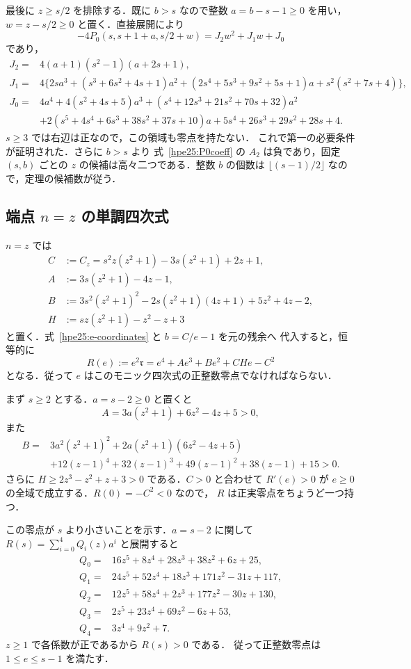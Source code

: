 最後に $z\ge s/2$ を排除する．既に $b>s$ なので整数
$a=b-s-1\ge0$ を用い，$w=z-s/2\ge0$ と置く．直接展開により
\begin{equation}\label{hpe25:wide-z}
 -4P_0(s,s+1+a,s/2+w)=J_2w^2+J_1w+J_0
\end{equation}
であり，
\begin{align*}
 J_2={}&4(a+1)(s^2-1)(a+2s+1),\\
 J_1={}&4\{2sa^3+(s^3+6s^2+4s+1)a^2
 +(2s^4+5s^3+9s^2+5s+1)a+s^2(s^2+7s+4)\},\\
 J_0={}&4a^4+4(s^2+4s+5)a^3
 +(s^4+12s^3+21s^2+70s+32)a^2\\
 &+2(s^5+4s^4+6s^3+38s^2+37s+10)a
 +5s^4+26s^3+29s^2+28s+4.
\end{align*}
$s\ge3$ では右辺は正なので，この領域も零点を持たない．
これで第一の必要条件が証明された．さらに $b>s$ より
式~\eqref{hpe25:P0coeff} の $A_2$ は負であり，固定 $(s,b)$ ごとの
$z$ の候補は高々二つである．整数 $b$ の個数は
$\lfloor(s-1)/2\rfloor$ なので，定理の候補数が従う．

\subsection{端点 \texorpdfstring{$n=z$}{n=z} の単調四次式}

$n=z$ では
\begin{align*}
 C&:=C_z=s^2z(z^2+1)-3s(z^2+1)+2z+1,\\
 A&:=3s(z^2+1)-4z-1,\\
 B&:=3s^2(z^2+1)^2-2s(z^2+1)(4z+1)+5z^2+4z-2,\\
 H&:=sz(z^2+1)-z^2-z+3
\end{align*}
と置く．式~\eqref{hpe25:e-coordinates} と $b=C/e-1$ を元の残余へ
代入すると，恒等的に
\begin{equation}\label{hpe25:R}
 R(e):=e^2\mathfrak r=e^4+Ae^3+Be^2+CHe-C^2
\end{equation}
となる．従って $e$ はこのモニック四次式の正整数零点でなければならない．

まず $s\ge2$ とする．$a=s-2\ge0$ と置くと
\[
 A=3a(z^2+1)+6z^2-4z+5>0,
\]
また
\begin{align*}
 B={}&3a^2(z^2+1)^2+2a(z^2+1)(6z^2-4z+5)\\
 &+12(z-1)^4+32(z-1)^3+49(z-1)^2+38(z-1)+15>0.
\end{align*}
さらに $H\ge2z^3-z^2+z+3>0$ である．$C>0$ と合わせて
$R'(e)>0$ が $e\ge0$ の全域で成立する．$R(0)=-C^2<0$ なので，
$R$ は正実零点をちょうど一つ持つ．

この零点が $s$ より小さいことを示す．$a=s-2$ に関して
$R(s)=\sum_{i=0}^4 Q_i(z)a^i$ と展開すると
\begin{align*}
Q_0={}&16z^5+8z^4+28z^3+38z^2+6z+25,\\
Q_1={}&24z^5+52z^4+18z^3+171z^2-31z+117,\\
Q_2={}&12z^5+58z^4+2z^3+177z^2-30z+130,\\
Q_3={}&2z^5+23z^4+69z^2-6z+53,\\
Q_4={}&3z^4+9z^2+7.
\end{align*}
$z\ge1$ で各係数が正であるから $R(s)>0$ である．
従って正整数零点は $1\le e\le s-1$ を満たす．


